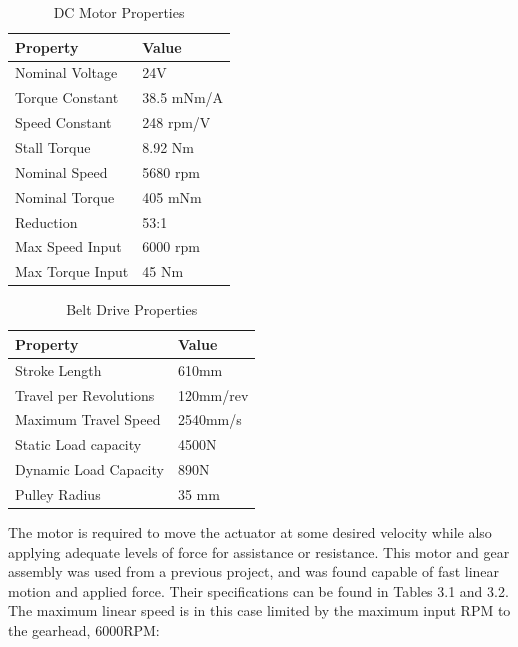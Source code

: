 \documentclass[12pt]{report}
\begin{document}
	\begin{table}[h]
	\centering
	\caption{DC Motor Properties}	
	\begin{tabular}{|l|l|}
		\hline
		\rowcolor{gray!10} \textbf{Property} & \textbf{Value}  \\ \hline
 		Nominal Voltage & 24V  \\ \hline
 		Torque Constant & 38.5 mNm/A \\ \hline
 		Speed Constant & 248 rpm/V  \\ \hline
 		Stall Torque & 8.92 Nm \\ \hline
 		Nominal Speed & 5680 rpm \\ \hline
 		Nominal Torque & 405 mNm \\ \hline
 		Reduction & 53:1  \\ \hline
 		Max Speed Input & 6000 rpm  \\ \hline
 		Max Torque Input & 45 Nm  \\ \hline
		\end{tabular}
	\label{tab:motor}
	\end{table}
	
	
	\begin{table}[h]
	\centering
	\caption{Belt Drive Properties}	
	\begin{tabular}{|l|l|}
		\hline
		\rowcolor{gray!10} \textbf{Property} & \textbf{Value}  \\ \hline
		Stroke Length & 610mm  \\ \hline
 		Travel per Revolutions & 120mm/rev  \\ \hline
 		Maximum Travel Speed & 2540mm/s  \\ \hline
 		Static Load capacity & 4500N \\ \hline
 		Dynamic Load Capacity & 890N  \\ \hline
 		Pulley Radius & 35 mm  \\ \hline
		\end{tabular}
	\label{tab:belt}
	\end{table}
	

	
	The motor is required to move the actuator at some desired velocity while also applying adequate levels of force for assistance or resistance. This motor and gear assembly was used from a previous project, and was found capable of fast linear motion and applied force. Their specifications can be found in Tables 3.1 and 3.2.  The maximum linear speed is in this case limited by the maximum input RPM to the gearhead, 6000RPM: 
	
\end{document}
